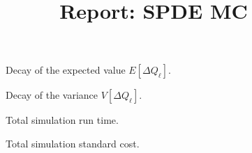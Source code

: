 \documentclass[11pt, oneside]{article}
\title{Report: SPDE MC}
\date{}
\newlength\figureheight
\newlength\figurewidth
\begin{document}
\maketitle

\begin{figure}[h]
\centering
\setlength{\figureheight}{0.3\textwidth}
\setlength{\figurewidth}{0.3\textwidth}

 \caption{\label{fig:E}Decay of the expected value $E[\Delta Q_\ell]$.}
\end{figure}


\begin{figure}[h]
\centering
\setlength{\figureheight}{0.3\textwidth}
\setlength{\figurewidth}{0.3\textwidth}

 \caption{\label{fig:V}Decay of the variance $V[\Delta Q_\ell]$.}
\end{figure}


\begin{figure}[h]
\centering
\setlength{\figureheight}{0.3\textwidth}
\setlength{\figurewidth}{0.3\textwidth}

 \caption{\label{fig:time}Total simulation run time.}
\end{figure}


\begin{figure}[h]
\centering
\setlength{\figureheight}{0.3\textwidth}
\setlength{\figurewidth}{0.3\textwidth}

 \caption{\label{fig:cost}Total simulation standard cost.}
\end{figure}
\end{document}
